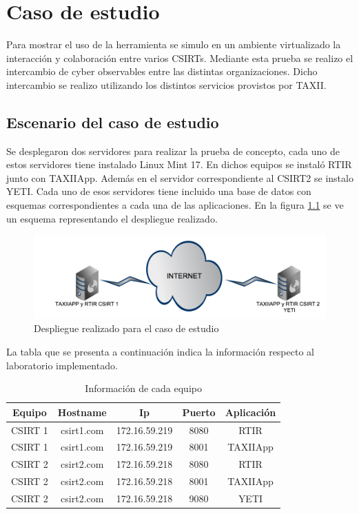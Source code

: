 \chapter{Caso de estudio}
\label{capitulo6}
Para mostrar el uso de la herramienta se simulo en un ambiente virtualizado la interacción y colaboración entre varios CSIRTs. Mediante esta prueba se realizo el intercambio de cyber observables entre las distintas organizaciones. Dicho intercambio se realizo utilizando los distintos servicios provistos por TAXII.

\section{Escenario del caso de estudio}
Se desplegaron dos servidores para realizar la prueba de concepto, cada uno de estos servidores tiene instalado Linux Mint 17. En dichos equipos se instaló RTIR junto con TAXIIApp. Además en el servidor correspondiente al CSIRT2 se instalo YETI. Cada uno de esos servidores tiene incluido una base de datos con esquemas correspondientes a cada una de las aplicaciones. En la figura \ref{fig.laboratorio_desplegado} se ve un esquema representando el despliegue realizado.

\begin{figure}[h!]
	\label{fig.laboratorio_desplegado}
	\centering
	\includegraphics[scale=0.4]{caso-de-estudio/laboratorioDesplegado.png}
	\caption{Despliegue realizado para el caso de estudio}
\end{figure}

La tabla que se presenta a continuación indica la información respecto al laboratorio implementado.

\begin{table}
	\begin{center}
		\begin{tabular}{|c|c|c|c|c|}
			\hline
			Equipo & Hostname & Ip & Puerto & Aplicación \\ \hline
			CSIRT 1 & csirt1.com & 172.16.59.219 & 8080 & RTIR \\ \hline
			CSIRT 1 & csirt1.com & 172.16.59.219 & 8001 & TAXIIApp \\ \hline
			CSIRT 2 & csirt2.com & 172.16.59.218 & 8080 & RTIR \\ \hline
			CSIRT 2 & csirt2.com & 172.16.59.218 & 8001 & TAXIIApp \\ \hline
			CSIRT 2 & csirt2.com & 172.16.59.218 & 9080 & YETI \\ \hline
		\end{tabular}
	\end{center}
	\caption{Información de cada equipo}
	\label{tabla_equipos}
\end{table}

